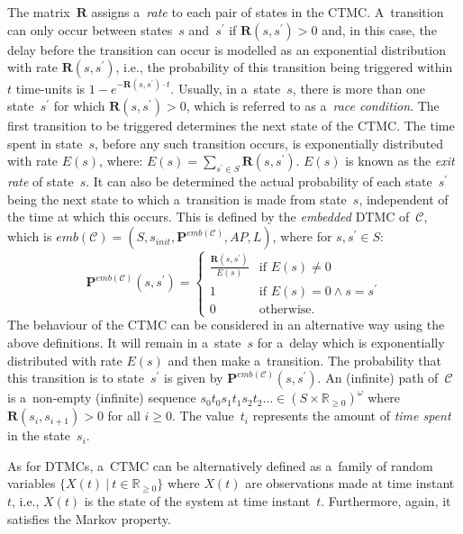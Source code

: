 \documentclass[a4paper, 11pt]{article}
\theoremstyle{definition}
\begin{document}
The matrix~$ \boldsymbol{R} $ assigns a~\emph{rate} to each pair of
states in the CTMC. A~transition can only occur between states~$ s $
and~$ s^\prime $ if $ \boldsymbol{R}(s, s^\prime) > 0 $ and, in this
case, the delay before the transition can occur is modelled as an
exponential distribution with rate $ \boldsymbol{R}(s, s^\prime) $,
i.e., the probability of this transition being triggered within~$ t $
time-units is $ 1 - e^{-\boldsymbol{R}(s, s^\prime) \cdot t} $.
Usually, in a~state~$ s $, there is more than one state~$ s^\prime $
for which $ \boldsymbol{R}(s, s^\prime) > 0 $, which is referred to
as a~\emph{race condition}. The first transition to be triggered
determines the next state of the CTMC. The time spent in state~$ s $,
before any such transition occurs, is exponentially distributed with
rate $ E(s) $, where: $ E(s) = \sum_{s^\prime \in S} \boldsymbol{R}(s,
s^\prime) $. $ E(s) $ is known as the \emph{exit rate} of state~$ s $.
It can also be determined the actual probability of each
state~$ s^\prime $ being the next state to which a~transition is made
from state~$ s $, independent of the time at which this occurs. This is
defined by the \emph{embedded} DTMC of~$ \mathcal{C} $, which is
$ emb(\mathcal{C}) = (S, s_{init}, \boldsymbol{P}^{emb(\mathcal{C})}, AP,
L) $, where for $ s, s^\prime \in
S $:
$$
    \boldsymbol{P}^{emb(\mathcal{C})}(s, s^\prime) =
    \begin{cases}
        \frac{\boldsymbol{R}(s, s^\prime)}{E(s)}
            & \text{if\ } E(s) \neq 0 \\
        1 & \text{if\ } E(s) = 0 \wedge s = s^\prime \\
        0 & \text{otherwise.}
    \end{cases}
$$
The behaviour of the CTMC can be considered in an alternative way using the
above definitions. It will remain in a~state~$ s $ for a~delay which
is exponentially distributed with rate $ E(s) $ and then make a~transition.
The probability that this transition is to state~$ s^\prime $ is given by
$ \boldsymbol{P}^{emb(\mathcal{C})}(s, s^\prime) $. An (infinite) path
of~$ \mathcal{C} $ is a~non-empty (infinite) sequence $ s_0 t_0 s_1 t_1 s_2
t_2 \ldots \in (S \times \mathbb{R}_{\geq 0})^\omega $ where
$ \boldsymbol{R}(s_i, s_{i + 1}) > 0 $ for all $ i \geq 0 $.
The value~$ t_i $ represents the amount of \emph{time spent} in the
state~$ s_i $.

As for DTMCs, a~CTMC can be alternatively defined as a~family of random
variables $ \{X(t)\ |\ t \in \mathbb{R}_{\geq 0}\} $ where $ X(t) $ are
observations made at time instant~$ t $, i.e., $ X(t) $ is the state of
the system at time instant~$ t $. Furthermore, again, it satisfies the
Markov property.
\end{document}

